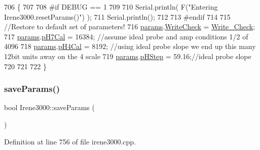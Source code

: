 \begin{DoxyCode}
706 \{
707 
708 \textcolor{preprocessor}{#if DEBUG == 1 }
709 
710     Serial.println( F(\textcolor{stringliteral}{"Entering Irene3000.resetParams()"}) );
711     Serial.println();
712 
713 \textcolor{preprocessor}{#endif }
714 
715     \textcolor{comment}{//Restore to default set of parameters!}
716     \hyperlink{class_irene3000_a136585a5ee7f9ac6ab52175fa153f8e3}{params}.\hyperlink{struct_irene3000_1_1parameters___t_a56f1f14d33a69300d580eda2dc52cecd}{WriteCheck} = \hyperlink{_irene3000_8h_a9fa3b8fd890fde289060ee254cd273d5}{Write\_Check};
717     \hyperlink{class_irene3000_a136585a5ee7f9ac6ab52175fa153f8e3}{params}.\hyperlink{struct_irene3000_1_1parameters___t_a21265466a570d84bff914f26d2f7a03e}{pH7Cal} = 16384; \textcolor{comment}{//assume ideal probe and amp conditions 1/2 of 4096}
718     \hyperlink{class_irene3000_a136585a5ee7f9ac6ab52175fa153f8e3}{params}.\hyperlink{struct_irene3000_1_1parameters___t_a1144de6fb54eb3e1dd2a3d8c2afc97dc}{pH4Cal} = 8192; \textcolor{comment}{//using ideal probe slope we end up this many 12bit units away on the
       4 scale}
719     \hyperlink{class_irene3000_a136585a5ee7f9ac6ab52175fa153f8e3}{params}.\hyperlink{struct_irene3000_1_1parameters___t_a61cfcc2539d5f630e9071f3753aba9fe}{pHStep} = 59.16;\textcolor{comment}{//ideal probe slope}
720 
721 
722 \}
\end{DoxyCode}
\mbox{\label{class_irene3000_a63dbd38e79b8cd5f1fba4b245501a894}} 
\subsubsection{\texorpdfstring{save\+Params()}{saveParams()}}
{\footnotesize\ttfamily bool Irene3000\+::save\+Params (\begin{DoxyParamCaption}{ }\end{DoxyParamCaption})}



Definition at line 756 of file irene3000.\+cpp.


